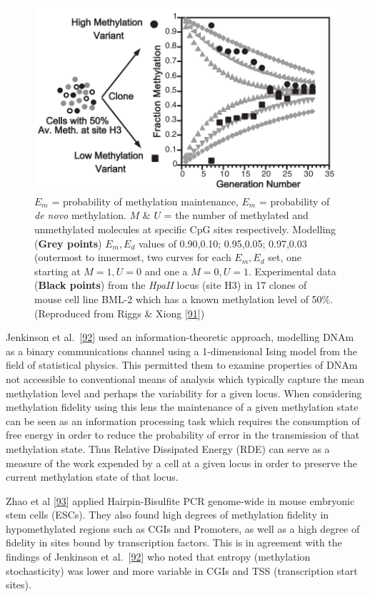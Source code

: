 \documentclass[
]{book}
\begin{document}
\begin{figure}

{\centering \includegraphics[width=0.7\linewidth]{figs/Riggs2004PNASfig2DNAmFidelity} 

}

\caption{\(E_m\) = probability of methylation maintenance, \(E_m\) = probability of \emph{de novo} methylation. \(M\) \& \(U\) = the number of methylated and unmethylated molecules at specific CpG sites respectively. Modelling (\textbf{Grey points}) \(E_m,E_d\) values of 0.90,0.10; 0.95,0.05; 0.97,0.03 (outermost to innermost, two curves for each \(E_m,E_d\) set, one starting at \(M=1,U=0\) and one a \(M=0,U=1\). Experimental data (\textbf{Black points}) from the \emph{HpaII} locus (site H3) in 17 clones of mouse cell line BML-2 which has a known methylation level of 50\%. (Reproduced from Riggs \& Xiong {[}\protect\hyperlink{ref-Riggs2004a}{91}{]})}\label{fig:Riggs2004PNASfig2DNAmFidelity}
\end{figure}



Jenkinson et al.~{[}\protect\hyperlink{ref-Jenkinson2017}{92}{]} used an information-theoretic approach, modelling DNAm as a binary communications channel using a 1-dimensional Ising model from the field of statistical physics.
This permitted them to examine properties of DNAm not accessible to conventional means of analysis which typically capture the mean methylation level and perhaps the variability for a given locus.
When considering methylation fidelity using this lens the maintenance of a given methylation state can be seen as an information processing task which requires the consumption of free energy in order to reduce the probability of error in the transmission of that methylation state.
Thus Relative Dissipated Energy (RDE) can serve as a measure of the work expended by a cell at a given locus in order to preserve the current methylation state of that locus.

Zhao et al {[}\protect\hyperlink{ref-Zhao2014}{93}{]} applied Hairpin-Bisulfite PCR genome-wide in mouse embryonic stem cells (ESCs).
They also found high degrees of methylation fidelity in hypomethylated regions such as CGIs and Promoters, as well as a high degree of fidelity in sites bound by transcription factors.
This is in agreement with the findings of Jenkinson et al.~{[}\protect\hyperlink{ref-Jenkinson2017}{92}{]} who noted that entropy (methylation stochasticity) was lower and more variable in CGIs and TSS (transcription start sites).
\end{document}
